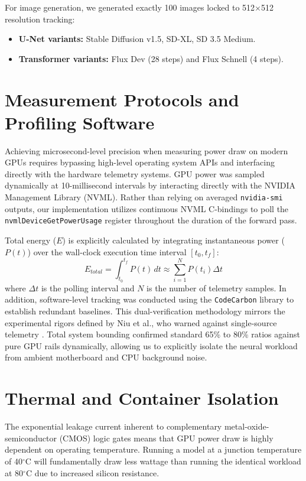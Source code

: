 \documentclass[12pt, a4paper]{report}
\begin{document}
For image generation, we generated exactly 100 images locked to 512$\times$512 resolution tracking:
\begin{itemize}
    \item \textbf{U-Net variants:} Stable Diffusion v1.5, SD-XL, SD 3.5 Medium.
    \item \textbf{Transformer variants:} Flux Dev (28 steps) and Flux Schnell (4 steps).
\end{itemize}

\section{Measurement Protocols and Profiling Software}
Achieving microsecond-level precision when measuring power draw on modern GPUs requires bypassing high-level operating system APIs and interfacing directly with the hardware telemetry systems. GPU power was sampled dynamically at 10-millisecond intervals by interacting directly with the NVIDIA Management Library (NVML). Rather than relying on averaged \texttt{nvidia-smi} outputs, our implementation utilizes continuous NVML C-bindings to poll the \texttt{nvmlDeviceGetPowerUsage} register throughout the duration of the forward pass. 

Total energy ($E$) is explicitly calculated by integrating instantaneous power ($P(t)$) over the wall-clock execution time interval $[t_0, t_f]$:
\begin{equation}
    E_{total} = \int_{t_0}^{t_f} P(t) \,dt \approx \sum_{i=1}^{N} P(t_i) \Delta t
\end{equation}
where $\Delta t$ is the polling interval and $N$ is the number of telemetry samples. In addition, software-level tracking was conducted using the \texttt{CodeCarbon} library to establish redundant baselines. This dual-verification methodology mirrors the experimental rigors defined by Niu et al., who warned against single-source telemetry \cite{niu2025tokenpowerbench}. Total system bounding confirmed standard 65\% to 80\% ratios against pure GPU rails dynamically, allowing us to explicitly isolate the neural workload from ambient motherboard and CPU background noise.

\section{Thermal and Container Isolation}
The exponential leakage current inherent to complementary metal-oxide-semiconductor (CMOS) logic gates means that GPU power draw is highly dependent on operating temperature. Running a model at a junction temperature of 40$^\circ$C will fundamentally draw less wattage than running the identical workload at 80$^\circ$C due to increased silicon resistance.
\end{document}
